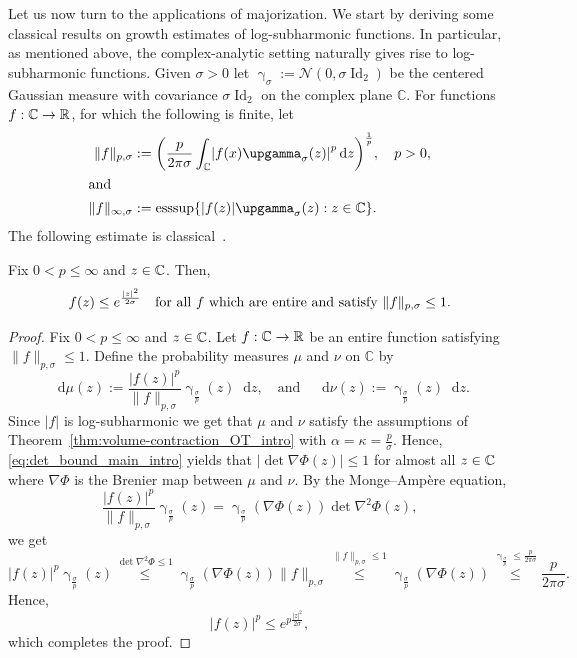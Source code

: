 \documentclass[AHL,Unicode,longabstracts]{cedram}
\newcommand{\R}{\mathbb R}
\newcommand{\C}{\mathbb C}
\DeclareMathOperator{\Id}{Id}
\DeclareMathOperator{\esssup}{esssup}
\newcommand{\density}{f}
\newcommand{\source}{\mu}
\newcommand{\target}{\nu}
\newcommand{\lsh}{\alpha}
\newcommand{\lc}{\kappa}
\newcommand*\diff{\mathop{}\!\mathrm{d}}
\newcommand{\clN}{\mathcal{N}}
\newcommand{\Gaussian}{\upgamma}
\newcommand{\OT}{\Phi}
\renewcommand*{\to}{\mathchoice{\longrightarrow}{\rightarrow}{\rightarrow}{\rightarrow}}
\let\originalleft\left
\let\originalright\right
\renewcommand{\left}{\mathopen{}\mathclose\bgroup\originalleft}
\renewcommand{\right}{\aftergroup\egroup\originalright}
\let\oldin\in
\renewcommand{\in}{\mathchoice{\oldin}{\oldin}{\,\oldin\,}{\,\oldin\,}}
\begin{document}
Let us now turn to the applications of majorization. We start by deriving some classical results on growth estimates of log-subharmonic functions. In particular, as mentioned above, the complex-analytic setting naturally gives rise to log-subharmonic functions. Given $\sigma>0$ let $\Gaussian_{\sigma}:=\clN(0,\sigma\Id_2)$ be the centered Gaussian measure with covariance $\sigma\Id_2$ on the complex plane $\C$. For functions $\density:\C\to\R$, for which the following is finite, let
\begin{align*}
\|f\|_{p,\sigma} &:=\left(\frac{p}{2\pi\sigma}\int_{\C}\left|f(x)\Gaussian_{\sigma}(z)\right|^p\diff z\right)^{\frac{1}{p}},\quad p>0,
\\
\intertext{and}
\|f\|_{\infty,\sigma} &:=\esssup\left\{|f(z)|\Gaussian_{\sigma}(z):z\in \C\right\}.
\end{align*}
The following estimate is classical~\cite[Theorem~2.7]{MR2934601}.
\begin{theo}\label{thm:Fock}
Fix $0<p\le \infty$ and $z\in \C$. Then,
\begin{equation}\label{eq:Fock}
\density(z)\le e^{\frac{|z|^2}{2\sigma}}\quad\textnormal{for all $\density$ which are entire and satisfy }\|\density\|_{p,\sigma}\le 1.
\end{equation}
\end{theo}
\begin{proof}
Fix $0<p\le \infty$ and $z\in \C$. Let $f:\C\to\R$ be an entire function satisfying $\|\density\|_{p,\sigma}\le 1$. Define the probability measures $\source$ and $\target$ on $\C$ by
\begin{equation}\label{eq:source_entire}
\diff \source(z):=\frac{|\density(z)|^p}{\|\density\|_{p,\sigma}} \Gaussian_{\frac{\sigma}{p}}(z)\diff z,\quad\text{and}\quad \diff\target(z):=\Gaussian_{\frac{\sigma}{p}}(z)\diff z.
\end{equation}
Since $|\density|$ is log-subharmonic we get that $\source$ and $\target$ satisfy the assumptions of Theorem~\ref{thm:volume-contraction_OT_intro} with $\lsh=\lc=\frac{p}{\sigma}$. Hence, \eqref{eq:det_bound_main_intro} yields that $|\det \nabla\OT(z)|\le 1$ for almost all $z\in \C$ where $\nabla\OT$ is the Brenier map between $\source$ and $\target$. By the Monge--Ampère equation,
\begin{equation}\label{eq:MA_Fock}
\frac{|\density(z)|^p}{\|\density\|_{p,\sigma}} \Gaussian_{\frac{\sigma}{p}}(z)= \Gaussian_{\frac{\sigma}{p}}(\nabla\OT(z))\det\nabla^2\OT(z),
\end{equation}
we get
\[
|\density(z)|^p \Gaussian_{\frac{\sigma}{p}}(z)\overset{\det\nabla^2\OT\le 1}{\le} \Gaussian_{\frac{\sigma}{p}}(\nabla\OT(z))\|\density\|_{p, \sigma}\overset{\|\density\|_{p,\sigma}\le 1}{\le}\Gaussian_{\frac{\sigma}{p}}(\nabla\OT(z))\overset{\Gaussian_{\frac{\sigma}{p}}\le \frac{p}{2\pi\sigma}}{\le} \frac{p}{2\pi\sigma}.
\]
Hence,
\[
|\density(z)|^p\le e^{p\frac{|z|^2}{2\sigma}},
\]
which completes the proof.
\end{proof}
\end{document}
